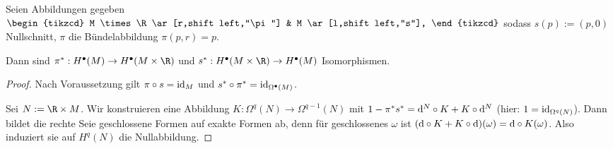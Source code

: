 \begin{st} \label{6.18}
    Seien Abbildungen gegeben
    \begin{math}
        \begin{tikzcd}
            M \times \R \ar[r,shift left,"\pi"] & M \ar[l,shift left,"s"],
        \end{tikzcd}
    \end{math}
    sodass $s(p) := (p, 0)$ Nullschnitt, $\pi$ die Bündelabbildung $\pi(p, r) = p$.

    Dann sind $\pi^*: H^\bullet(M) \to H^\bullet(M \times \R)$ und $s^*: H^\bullet(M\times \R) \to H^\bullet(M)$ Isomorphismen.
    \begin{proof}
        Nach Voraussetzung gilt $\pi \circ s = \operatorname{id}_M$ und $s^* \circ \pi^* = \operatorname{id}_{\Omega^\bullet(M)}$.

        Sei $N := \R \times M$.
        Wir konstruieren eine Abbildung
        \begin{math}
            K: \Omega^q(N) \to \Omega^{q-1}(N)
        \end{math}
        mit $1 - \pi^* s^* = \mathrm{d}^N \circ K + K \circ \mathrm{d}^N$ (hier: $1  = \operatorname{id}_{\Omega^q(N)}$).
        Dann bildet die rechte Seie geschlossene Formen auf exakte Formen ab, denn für geschlossenes $\omega$ ist $(\mathrm{d} \circ K + K \circ \mathrm{d})(\omega) = \mathrm{d} \circ K(\omega)$.
        Also induziert sie auf $H^q(N)$ die Nullabbildung.


\end{proof}
\end{st}
